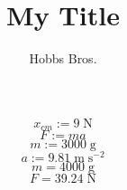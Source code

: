 \documentclass[12pt]{article}
\begin{document}
\title{My Title}
\author{Hobbs Bros.}
\maketitle
$$
x_{cm} := 9 \; \mathrm{N}
$$
$$
F := m a
$$
$$
m := 3000 \; \mathrm{g}
$$
$$
a := 9.81 \; \mathrm{m} \; \mathrm{s^{-2}}
$$
$$
m = 4000 \; \mathrm{g}
$$
$$
F = 39.24 \; \mathrm{N}
$$
\end{document}

